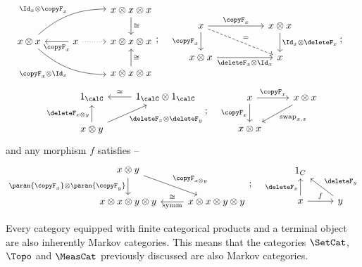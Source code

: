 \documentclass[12pt,oneside,pb-diagram]{article}
\begin{document}
%
\begin{equation} \label{eqn:def:MarkovCat:1}
	\begin{tikzcd}
		& & x \otimes x \otimes x \arrow[d, "\cong"] \\
		x\otimes x \arrow[bend left = 20]{urr}{ \Id_x \otimes \copyF_x } \arrow[bend right = 20]{drr}[swap]{ \copyF_x \otimes \Id_x } & x \arrow[l, "\copyF_x"] \arrow[r, dotted] & x \otimes x \otimes x \\
		& & x \otimes x \otimes x \arrow[u, "\cong"']
	\end{tikzcd} ; \quad 
	\begin{tikzcd}
		x \arrow[dashed, drr, "="] \arrow{d}[swap]{ \copyF_x } \arrow{rr}{ \copyF_x } & & x \otimes x \arrow{d}{ \Id_x \otimes \deleteF_x } \\
		x\otimes x \arrow{rr}[swap]{ \deleteF_x \otimes \Id_x } & & x
	\end{tikzcd} ; \quad 
\end{equation}
%
\begin{equation} \label{eqn:def:MarkovCat:2}
	\begin{tikzcd}
		1_{\calC} & 1_{\calC} \otimes 1_{\calC} \arrow{l}[swap]{ \cong } \\
		x \otimes y \arrow{u}{ \deleteF_{x\otimes y} } \arrow{ru}[swap]{ \deleteF_x \otimes \deleteF_y } 
	\end{tikzcd} ; \quad 
	\begin{tikzcd}
		x \arrow{d}[swap]{ \copyF_{x} } \arrow{r}{ \copyF_x } & x \otimes x \arrow[dl, "\text{swap}_{x,x}"] \\
		x \otimes x
	\end{tikzcd}
\end{equation}
%
and any morphism $f$ satisfies -- 
%
\begin{equation} \label{eqn:def:MarkovCat:3}
	\begin{tikzcd}
		x\otimes y \arrow{d}[swap]{ \paran{ \copyF_{x} } \otimes \paran{ \copyF_{y} } } \arrow{dr}{ \copyF_{x\otimes y} } & \\
		x\otimes x \otimes y \otimes y & x\otimes x \otimes y \otimes y \arrow{l}{ \text{symm} }[swap]{\cong}
	\end{tikzcd} ; \quad 
	\begin{tikzcd}
		1_C \\
		x \arrow{u}{ \deleteF_x } \arrow{r}{f} & y \arrow{ul}[swap]{ \deleteF_y }
	\end{tikzcd}
\end{equation}
%

\begin{Erg}{}{} 
	Every category equipped with finite categorical products and a terminal object are also inherently Markov categories. This means that the categories $\SetCat$, $\Topo$ and $\MeasCat$ previously discussed are also Markov categories.
\end{Erg}
\end{document}
